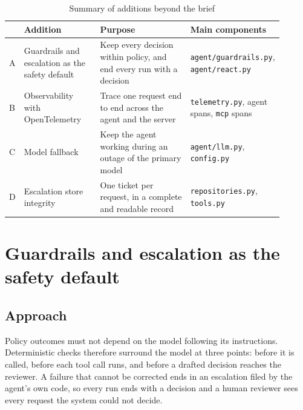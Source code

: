 \documentclass[11pt,letterpaper]{article}
\renewcommand{\_}{\textunderscore\allowbreak}
\begin{document}
\begin{table}[H]
\centering
\caption{Summary of additions beyond the brief}
\label{tab:additions}
\begin{tabular}{p{0.04\linewidth} p{0.28\linewidth} p{0.34\linewidth} p{0.24\linewidth}}
\hline
 & \textbf{Addition} & \textbf{Purpose} & \textbf{Main components} \\
\hline
A & Guardrails and escalation as the safety default & Keep every decision within policy, and end every run with a decision & \texttt{agent/guardrails.py}, \texttt{agent/react.py} \\
B & Observability with OpenTelemetry & Trace one request end to end across the agent and the server & \texttt{telemetry.py}, agent spans, \texttt{mcp} spans \\
C & Model fallback & Keep the agent working during an outage of the primary model & \texttt{agent/llm.py}, \texttt{config.py} \\
D & Escalation store integrity & One ticket per request, in a complete and readable record & \texttt{repositories.py}, \texttt{tools.py} \\
\hline
\end{tabular}
\end{table}

\section{Guardrails and escalation as the safety default}

\subsection*{Approach}
Policy outcomes must not depend on the model following its instructions. Deterministic checks
therefore surround the model at three points: before it is called, before each tool call runs,
and before a drafted decision reaches the reviewer. A failure that cannot be corrected ends in an
escalation filed by the agent's own code, so every run ends with a decision and a human reviewer
sees every request the system could not decide.
\end{document}
